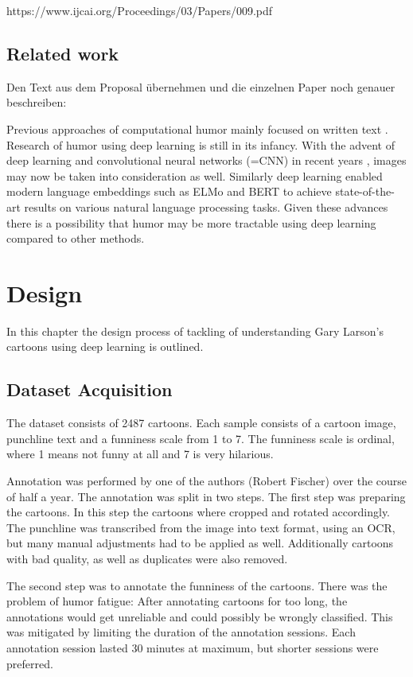 \documentclass[draft,final,oneside]{vutinfth} %
\begin{document}
https://www.ijcai.org/Proceedings/03/Papers/009.pdf

\section{Related work}

Den Text aus dem Proposal übernehmen und die einzelnen Paper noch genauer beschreiben:

Previous approaches of computational humor mainly focused on written text \cite{Yang2015HumorRA}\cite{Bamman2015ContextualizedSD}\cite{HumoristBot}. Research of humor using deep learning is still in its infancy. With the advent of deep learning and convolutional neural networks (=CNN) in recent years \cite{Druzhkov2016}, images may now be taken into consideration as well. Similarly deep learning enabled modern language embeddings such as ELMo \cite{elmo} and BERT \cite{bert} to achieve state-of-the-art results on various natural language processing tasks. Given these advances there is a possibility that humor may be more tractable using deep learning compared to other methods.


\chapter{Design} \label{design}

In this chapter the design process of tackling of understanding Gary Larson's cartoons using deep learning is outlined.


\section{Dataset Acquisition}
The dataset consists of 2487 cartoons. Each sample consists of a cartoon image, punchline text and a funniness scale from 1 to 7. The funniness scale is ordinal, where 1 means not funny at all and 7 is very hilarious.

Annotation was performed by one of the authors (Robert Fischer) over the course of half a year. The annotation was split in two steps. The first step was preparing the cartoons. In this step the cartoons where cropped and rotated accordingly. The punchline was transcribed from the image into text format, using an OCR, but many manual adjustments had to be applied as well. Additionally cartoons with bad quality, as well as duplicates were also removed.

The second step was to annotate the funniness of the cartoons. There was the problem of humor fatigue: After annotating cartoons for too long, the annotations would get unreliable and could possibly be wrongly classified. This was mitigated by limiting the duration of the annotation sessions. Each annotation session lasted 30 minutes at maximum, but shorter sessions were preferred. 
\end{document}
